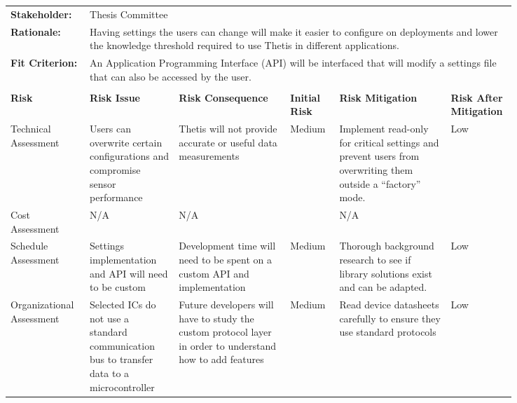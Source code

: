\begin{landscape}
{\begin{longtable}{| p{0.12\linewidth} | p{0.16\linewidth} |  p{0.20\linewidth} | p{0.08\linewidth} | p{0.20\linewidth} | p{0.08\linewidth} |}
	\hline
	\rowcolor[gray]{0.8}
	\multicolumn{6}{|c|}{ } \\
	\hline
	\textbf{Stakeholder:} & \multicolumn{5}{|l|}{Thesis Committee} \\
	\hline
	\textbf{Rationale:} & \multicolumn{5}{|p{0.8\linewidth}|}{Having settings the users can change will make it easier to configure on deployments and lower the knowledge threshold required to use Thetis in different applications.} \\
	\hline
	\textbf{Fit Criterion:} & \multicolumn{5}{|p{0.8\linewidth}|}{An Application Programming Interface (API) will be interfaced that will modify a settings file that can also be accessed by the user.} \\
	\hline
	\rowcolor[gray]{0.8}
	\multicolumn{6}{|c|}{ } \\
	\hline
	\textbf{Risk} & \textbf{Risk Issue} & \textbf{Risk Consequence} & \textbf{Initial Risk} & \textbf{Risk Mitigation} & \textbf{Risk \newline After \newline Mitigation} \\
	\hline
	Technical \newline Assessment & Users can overwrite certain configurations and compromise sensor performance & Thetis will not provide accurate or useful data measurements  & \cellcolor{yellow} Medium & Implement read-only for critical settings and prevent users from overwriting them outside a ``factory'' mode. & \cellcolor{green} Low \\
	\hline
	Cost \newline Assessment & N/A & N/A & \cellcolor[gray]{0.8} & N/A & \cellcolor[gray]{0.8} \\
	\hline
	Schedule \newline Assessment & Settings implementation and API will need to be custom & Development time will need to be spent on a custom API and implementation & \cellcolor{yellow} Medium & Thorough background research to see if library solutions exist and can be adapted. & \cellcolor{green} Low \\
	\hline
	Organizational \newline Assessment & Selected ICs do not use a standard communication bus to transfer data to a microcontroller & Future developers will have to study the custom protocol layer in order to understand how to add features & \cellcolor{yellow} Medium & Read device datasheets carefully to ensure they use standard protocols & \cellcolor{green} Low \\
	\hline

\end{longtable}}
\end{landscape}
